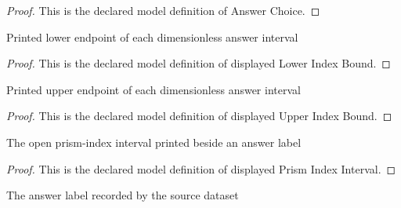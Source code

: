 \begin{proof}
  This is the declared model definition of Answer Choice.
\end{proof}
\begin{definition}
  \label{def:physics:phyx-mini-0147:phyxminiproblems-problemphyxmini0147-displayedlowerindexbound}
  Printed lower endpoint of each dimensionless answer interval
\end{definition}
\begin{proof}
  This is the declared model definition of displayed Lower Index Bound.
\end{proof}
\begin{definition}
  \label{def:physics:phyx-mini-0147:phyxminiproblems-problemphyxmini0147-displayedupperindexbound}
  Printed upper endpoint of each dimensionless answer interval
\end{definition}
\begin{proof}
  This is the declared model definition of displayed Upper Index Bound.
\end{proof}
\begin{definition}
  \label{def:physics:phyx-mini-0147:phyxminiproblems-problemphyxmini0147-displayedprismindexinterval}
  The open prism-index interval printed beside an answer label
\end{definition}
\begin{proof}
  This is the declared model definition of displayed Prism Index Interval.
\end{proof}
\begin{definition}
  \label{def:physics:phyx-mini-0147:phyxminiproblems-problemphyxmini0147-recordeddatasetanswer}
  The answer label recorded by the source dataset
\end{definition}

